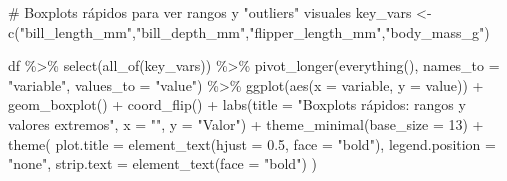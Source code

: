 \documentclass[
  spanish,
  11pt,
  a4paper,
  DIV=11,
  numbers=noendperiod]{scrartcl}
\newenvironment{Shaded}{\begin{snugshade}}{\end{snugshade}}
\newcommand{\AttributeTok}[1]{\textcolor[rgb]{0.40,0.45,0.13}{#1}}
\newcommand{\CommentTok}[1]{\textcolor[rgb]{0.37,0.37,0.37}{#1}}
\newcommand{\DecValTok}[1]{\textcolor[rgb]{0.68,0.00,0.00}{#1}}
\newcommand{\FloatTok}[1]{\textcolor[rgb]{0.68,0.00,0.00}{#1}}
\newcommand{\FunctionTok}[1]{\textcolor[rgb]{0.28,0.35,0.67}{#1}}
\newcommand{\NormalTok}[1]{\textcolor[rgb]{0.00,0.23,0.31}{#1}}
\newcommand{\OtherTok}[1]{\textcolor[rgb]{0.00,0.23,0.31}{#1}}
\newcommand{\SpecialCharTok}[1]{\textcolor[rgb]{0.37,0.37,0.37}{#1}}
\newcommand{\StringTok}[1]{\textcolor[rgb]{0.13,0.47,0.30}{#1}}
\begin{document}
\begin{Shaded}
\begin{Highlighting}[numbers=left,,]
\CommentTok{\# Boxplots rápidos para ver rangos y "outliers" visuales}
\NormalTok{key\_vars }\OtherTok{\textless{}{-}} \FunctionTok{c}\NormalTok{(}\StringTok{"bill\_length\_mm"}\NormalTok{,}\StringTok{"bill\_depth\_mm"}\NormalTok{,}\StringTok{"flipper\_length\_mm"}\NormalTok{,}\StringTok{"body\_mass\_g"}\NormalTok{)}

\NormalTok{df }\SpecialCharTok{\%\textgreater{}\%}
  \FunctionTok{select}\NormalTok{(}\FunctionTok{all\_of}\NormalTok{(key\_vars)) }\SpecialCharTok{\%\textgreater{}\%}
  \FunctionTok{pivot\_longer}\NormalTok{(}\FunctionTok{everything}\NormalTok{(), }\AttributeTok{names\_to =} \StringTok{"variable"}\NormalTok{, }\AttributeTok{values\_to =} \StringTok{"value"}\NormalTok{) }\SpecialCharTok{\%\textgreater{}\%}
  \FunctionTok{ggplot}\NormalTok{(}\FunctionTok{aes}\NormalTok{(}\AttributeTok{x =}\NormalTok{ variable, }\AttributeTok{y =}\NormalTok{ value)) }\SpecialCharTok{+}
  \FunctionTok{geom\_boxplot}\NormalTok{() }\SpecialCharTok{+}
  \FunctionTok{coord\_flip}\NormalTok{() }\SpecialCharTok{+}
  \FunctionTok{labs}\NormalTok{(}\AttributeTok{title =} \StringTok{"Boxplots rápidos: rangos y valores extremos"}\NormalTok{,}
       \AttributeTok{x =} \StringTok{""}\NormalTok{, }\AttributeTok{y =} \StringTok{"Valor"}\NormalTok{) }\SpecialCharTok{+}
  \FunctionTok{theme\_minimal}\NormalTok{(}\AttributeTok{base\_size =} \DecValTok{13}\NormalTok{) }\SpecialCharTok{+}
  \FunctionTok{theme}\NormalTok{(}
   \AttributeTok{plot.title =} \FunctionTok{element\_text}\NormalTok{(}\AttributeTok{hjust =} \FloatTok{0.5}\NormalTok{, }\AttributeTok{face =} \StringTok{"bold"}\NormalTok{),}
   \AttributeTok{legend.position =} \StringTok{"none"}\NormalTok{,}
   \AttributeTok{strip.text =} \FunctionTok{element\_text}\NormalTok{(}\AttributeTok{face =} \StringTok{"bold"}\NormalTok{)}
\NormalTok{   )}
\end{Highlighting}
\end{Shaded}
\end{document}

